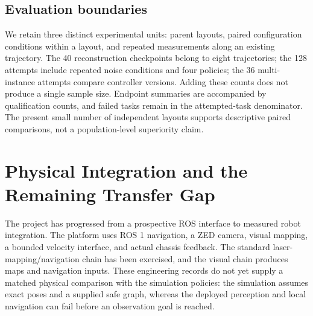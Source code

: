 \documentclass[11pt,a4paper]{article}
\providecommand{\hypertarget}[2]{#2}
\begin{document}
\hypertarget{evaluation-boundaries}{%
\subsection{Evaluation boundaries}\label{evaluation-boundaries}}

We retain three distinct experimental units: parent layouts, paired configuration conditions within a layout, and repeated measurements along an existing trajectory. The 40 reconstruction checkpoints belong to eight trajectories; the 128 attempts include repeated noise conditions and four policies; the 36 multi-instance attempts compare controller versions. Adding these counts does not produce a single sample size. Endpoint summaries are accompanied by qualification counts, and failed tasks remain in the attempted-task denominator. The present small number of independent layouts supports descriptive paired comparisons, not a population-level superiority claim.

\hypertarget{physical-integration-and-the-remaining-transfer-gap}{%
\section{Physical Integration and the Remaining Transfer Gap}\label{physical-integration-and-the-remaining-transfer-gap}}

The project has progressed from a prospective ROS interface to measured robot integration. The platform uses ROS 1 navigation, a ZED camera, visual mapping, a bounded velocity interface, and actual chassis feedback. The standard laser-mapping/navigation chain has been exercised, and the visual chain produces maps and navigation inputs. These engineering records do not yet supply a matched physical comparison with the simulation policies: the simulation assumes exact poses and a supplied safe graph, whereas the deployed perception and local navigation can fail before an observation goal is reached.
\end{document}
